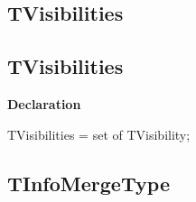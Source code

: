 \documentclass{report}
\newif\ifpdf
\begin{document}
\subsection*{\large{\textbf{TVisibilities}}\normalsize\hspace{1ex}\hrulefill}
\else
\subsection*{TVisibilities}
\fi
\label{PasDoc_Items-TVisibilities}
\begin{list}{}{
\setlength{\itemindent}{0cm}
\setlength{\listparindent}{0cm}
\setlength{\leftmargin}{\evensidemargin}
\addtolength{\leftmargin}{\tmplength}
\settowidth{\labelsep}{X}
\addtolength{\leftmargin}{\labelsep}
\setlength{\labelwidth}{\tmplength}
}
\item[\textbf{Declaration}\hfill]
\ifpdf
\begin{flushleft}
\fi
\begin{ttfamily}
TVisibilities = set of TVisibility;\end{ttfamily}

\ifpdf
\end{flushleft}
\fi

\end{list}
\ifpdf
\subsection*{\large{\textbf{TInfoMergeType}}\normalsize\hspace{1ex}\hrulefill}
\else
\end{document}
